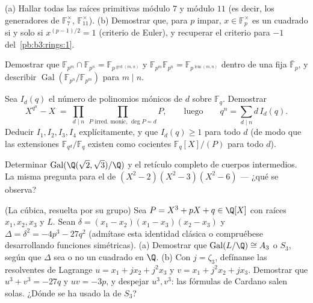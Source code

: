 \begin{exercise}[$\star\star$]\label{exo:b3:galois:4}
(a) Hallar todas las raíces primitivas módulo $7$ y módulo $11$ (es
decir, los generadores de $\mathbb F_7^\times$,
$\mathbb F_{11}^\times$). (b) Demostrar que, para $p$ impar,
$x \in \mathbb F_p^\times$ es un cuadrado si y solo si $x^{(p-1)/2} = 1$
(criterio de Euler), y recuperar el criterio para $-1$
del~\cref{pb:b3:rings:1}.
\end{exercise}

\begin{exercise}[$\star\star$]\label{exo:b3:galois:5}
Demostrar que $\mathbb F_{p^m} \cap \mathbb F_{p^n} = \mathbb
F_{p^{\gcd(m,n)}}$ y $\mathbb F_{p^m}\mathbb F_{p^n} = \mathbb
F_{p^{\operatorname{lcm}(m,n)}}$ dentro de una
 fija
$\bar{\mathbb F}_p$, y describir
$\operatorname{Gal}(\mathbb F_{p^n}/\mathbb F_{p^m})$ para $m
\mid n$.
\end{exercise}

\begin{exercise}[$\star\star$]\label{exo:b3:galois:6}
Sea $I_d(q)$ el número de polinomios mónicos
 de
 $d$ sobre $\mathbb F_q$.
Demostrar
\[
X^{q^n} - X \;=\; \prod_{d \mid n}\ \prod_{P \text{ irred.
monic, } \deg P = d} P ,
\qquad\text{luego}\qquad
q^n = \sum_{d \mid n} d\, I_d(q).
\]
Deducir $I_1, I_2, I_3, I_4$ explícitamente, y que $I_d(q) \geq 1$ para
todo $d$ (de modo que las extensiones $\mathbb F_{q^d}/\mathbb F_q$
existen como cocientes $\mathbb F_q[X]/(P)$ para todo $d$).
\end{exercise}

\begin{exercise}[$\star\star$]\label{exo:b3:galois:7}
Determinar $\operatorname{Gal}(\Q(\sqrt2,\sqrt3)/\Q)$ y el retículo
completo de cuerpos intermedios. La misma pregunta para el
 de
$(X^2-2)(X^2-3)(X^2-6)$ --- ¿qué se observa?
\end{exercise}

\begin{exercise}[$\star\star$]\label{exo:b3:galois:8}
(La cúbica, resuelta por su grupo) Sea $P = X^3 + pX + q \in
\Q[X]$  con raíces
$x_1, x_2, x_3$ y  $L$. Sean $\delta = (x_1 - x_2)(x_1 - x_3)(x_2 - x_3)$ y
$\Delta = \delta^2 = -4p^3 - 27q^2$ (admítase esta identidad clásica o
compruébese desarrollando funciones simétricas). (a) Demostrar que
$\operatorname{Gal}(L/\Q) \cong A_3$ o $S_3$, según que $\Delta$ sea o
no un cuadrado en $\Q$. (b) Con $j = \zeta_3$, defínanse las resolventes
de Lagrange $u = x_1
+ jx_2 + j^2x_3$ y $v = x_1 + j^2x_2 + jx_3$. Demostrar que $u^3 + v^3
= -27q$ y $uv = -3p$, y despejar $u^3, v^3$: las fórmulas de Cardano
salen solas. ¿Dónde se ha usado la
 de $S_3$?
\end{exercise}

